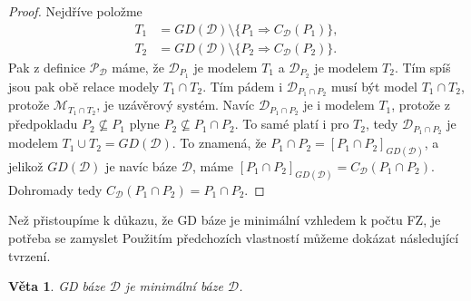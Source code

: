 \documentclass{article}
\newtheorem{theorem}{Věta}
\theoremstyle {definition}
\begin{document}
\begin{proof}
  Nejdříve položme 
  \begin {align*}
  T_1 &= GD(\mathcal D) \setminus \{P_1 \Rightarrow C_{\mathcal{D}}(P_1)\}, \\
  T_2 &= GD(\mathcal D) \setminus \{P_2 \Rightarrow C_{\mathcal{D}}(P_2)\}.
  \end {align*}
  Pak z definice $\mathcal P_{\mathcal D}$ máme, že
  $\mathcal{D}_{P_1}$ je modelem $T_1$ a $\mathcal{D}_{P_2}$ je
  modelem $T_2$. Tím spíš jsou pak obě relace modely $T_1\cap
  T_2$. Tím pádem i $\mathcal{D}_{P_1 \cap P_2}$ musí být model $T_1
  \cap T_2$, protože $\mathcal{M}_{T_1 \cap T_2}$, je uzávěrový
  systém. Navíc $\mathcal{D}_{P_1 \cap P_2}$ je i modelem $T_1$,
  protože z předpokladu $P_2 \not\subseteq P_1$ plyne $P_2
  \not\subseteq P_1\cap P_2$. To samé platí i pro $T_2$, tedy
  $\mathcal{D}_{P_1 \cap P_2}$ je modelem $T_1 \cup T_2 = GD(\mathcal
  D)$. To znamená, že $P_1 \cap P_2 = [P_1 \cap P_2]_{GD(\mathcal
    D)}$, a jelikož $GD(\mathcal D)$ je navíc báze $\mathcal D$, máme
  $[P_1 \cap P_2]_{GD(\mathcal D)} = C_{\mathcal D}(P_1 \cap
  P_2)$. Dohromady tedy $C_{\mathcal{D}}(P_1 \cap P_2) = P_1 \cap
  P_2$.
\end{proof}

Než přistoupíme k důkazu, že GD báze je minimální vzhledem k počtu FZ,
je potřeba se zamyslet Použitím předchozích vlastností můžeme dokázat
následující tvrzení.

\begin{theorem}
  GD báze $\mathcal{D}$ je minimální báze $\mathcal{D}$.
\end{theorem}
\end{document}

